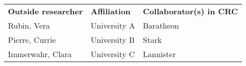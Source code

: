 
\begin{longtable}{lll}
  \textbf{Outside researcher} & \textbf{Affiliation} &
  \textbf{Collaborator(s) in CRC}\\
  Rubin, Vera & University A & Baratheon\\
  Pierre, Currie & University B & Stark\\
  Immerwahr, Clara & University C & Lannister\\
\end{longtable}

